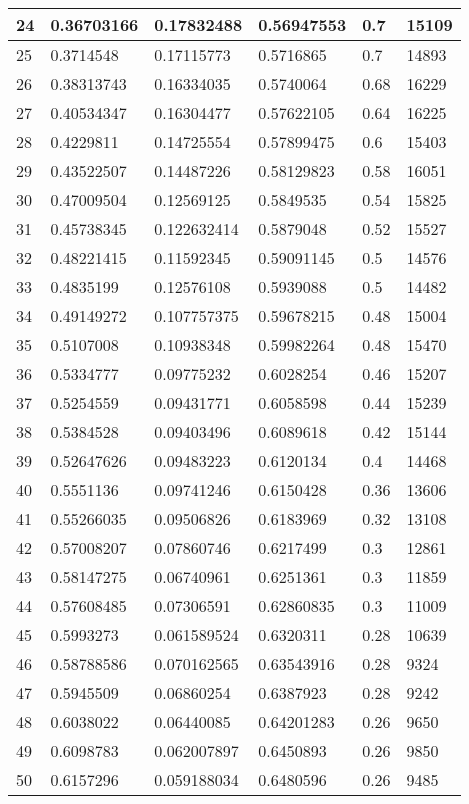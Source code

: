 \begin{longtable}{|l|l|l|l|l|l|}
24 & 0.36703166 & 0.17832488 & 0.56947553 & 0.7 & 15109 \\ \hline 
25 & 0.3714548 & 0.17115773 & 0.5716865 & 0.7 & 14893 \\ \hline 
26 & 0.38313743 & 0.16334035 & 0.5740064 & 0.68 & 16229 \\ \hline 
27 & 0.40534347 & 0.16304477 & 0.57622105 & 0.64 & 16225 \\ \hline 
28 & 0.4229811 & 0.14725554 & 0.57899475 & 0.6 & 15403 \\ \hline 
29 & 0.43522507 & 0.14487226 & 0.58129823 & 0.58 & 16051 \\ \hline 
30 & 0.47009504 & 0.12569125 & 0.5849535 & 0.54 & 15825 \\ \hline 
31 & 0.45738345 & 0.122632414 & 0.5879048 & 0.52 & 15527 \\ \hline 
32 & 0.48221415 & 0.11592345 & 0.59091145 & 0.5 & 14576 \\ \hline 
33 & 0.4835199 & 0.12576108 & 0.5939088 & 0.5 & 14482 \\ \hline 
34 & 0.49149272 & 0.107757375 & 0.59678215 & 0.48 & 15004 \\ \hline 
35 & 0.5107008 & 0.10938348 & 0.59982264 & 0.48 & 15470 \\ \hline 
36 & 0.5334777 & 0.09775232 & 0.6028254 & 0.46 & 15207 \\ \hline 
37 & 0.5254559 & 0.09431771 & 0.6058598 & 0.44 & 15239 \\ \hline 
38 & 0.5384528 & 0.09403496 & 0.6089618 & 0.42 & 15144 \\ \hline 
39 & 0.52647626 & 0.09483223 & 0.6120134 & 0.4 & 14468 \\ \hline 
40 & 0.5551136 & 0.09741246 & 0.6150428 & 0.36 & 13606 \\ \hline 
41 & 0.55266035 & 0.09506826 & 0.6183969 & 0.32 & 13108 \\ \hline 
42 & 0.57008207 & 0.07860746 & 0.6217499 & 0.3 & 12861 \\ \hline 
43 & 0.58147275 & 0.06740961 & 0.6251361 & 0.3 & 11859 \\ \hline 
44 & 0.57608485 & 0.07306591 & 0.62860835 & 0.3 & 11009 \\ \hline 
45 & 0.5993273 & 0.061589524 & 0.6320311 & 0.28 & 10639 \\ \hline 
46 & 0.58788586 & 0.070162565 & 0.63543916 & 0.28 & 9324 \\ \hline 
47 & 0.5945509 & 0.06860254 & 0.6387923 & 0.28 & 9242 \\ \hline 
48 & 0.6038022 & 0.06440085 & 0.64201283 & 0.26 & 9650 \\ \hline 
49 & 0.6098783 & 0.062007897 & 0.6450893 & 0.26 & 9850 \\ \hline 
50 & 0.6157296 & 0.059188034 & 0.6480596 & 0.26 & 9485 \\ \hline 
\end{longtable}